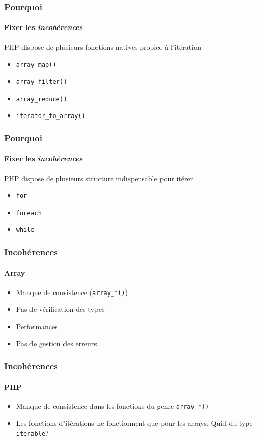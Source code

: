 \begin{frame}
	\frametitle{Pourquoi}
    \framesubtitle{Fixer les \textit{incohérences}}

    PHP dispose de plusieurs fonctions natives propice à l'itération

    \begin{itemize}[<+->]
        \item \texttt{array\_map()}
        \item \texttt{array\_filter()}
        \item \texttt{array\_reduce()}
        \item \texttt{iterator\_to\_array()}
    \end{itemize}
\end{frame}

\begin{frame}
	\frametitle{Pourquoi}
    \framesubtitle{Fixer les \textit{incohérences}}

    PHP dispose de plusieurs structure indispensable pour itérer

    \begin{itemize}[<+->]
        \item \texttt{for}
        \item \texttt{foreach}
        \item \texttt{while}
    \end{itemize}
\end{frame}

\begin{frame}
	\frametitle{Incohérences}
    \framesubtitle{Array}

    \begin{itemize}[<+->]
        \item Manque de consistence (\texttt{array\_*()})
        \item Pas de vérification des types
        \item Performances
        \item Pas de gestion des erreurs
    \end{itemize}
\end{frame}

\begin{frame}
	\frametitle{Incohérences}
    \framesubtitle{PHP}

    \begin{itemize}[<+->]
        \item Manque de consistence dans les fonctions du genre \texttt{array\_*()}
        \item Les fonctions d'itérations ne fonctionnent que pour les arrays. Quid du type \texttt{iterable}?
    \end{itemize}
\end{frame}

